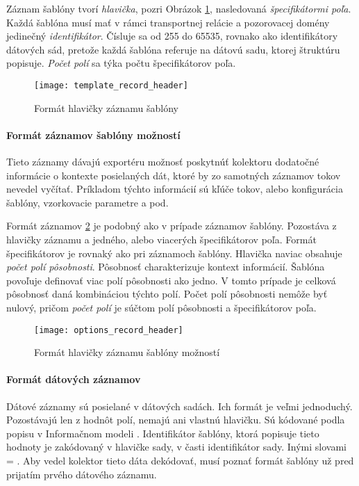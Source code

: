 Záznam šablóny tvorí \emph{hlavička}, pozri Obrázok \ref{o:template_record_header}, nasledovaná 
\emph{špecifikátormi poľa}. 
Každá šablóna musí mať v rámci transportnej relácie a pozorovacej domény jedinečný \emph{identifikátor}. 
Čísluje sa od 255 do 65535, rovnako ako identifikátory dátových sád, pretože každá šablóna referuje 
na dátovú sadu, ktorej štruktúru popisuje. \emph{Počet polí} sa týka počtu 
špecifikátorov poľa.

\begin{figure}[ht!]
\centering
\texttt{[image: template\_record\_header]}
\caption{Formát hlavičky záznamu šablóny}\label{o:template_record_header}
\end{figure}



\paragraph{Formát záznamov šablóny možností}

Tieto záznamy dávajú exportéru možnosť poskytnúť kolektoru dodatočné informácie o kontexte posielaných dát, 
ktoré by zo samotných 
záznamov tokov nevedel vyčítať. Príkladom týchto informácií sú kľúče tokov, alebo konfigurácia šablóny,
vzorkovacie parametre a pod.

Formát záznamov \ref{o:options_record_header} je podobný ako v prípade záznamov šablóny. Pozostáva z hlavičky záznamu 
a jedného, alebo viacerých špecifikátorov poľa. Formát špecifikátorov je rovnaký ako pri záznamoch šablóny.
Hlavička naviac obsahuje \emph{počet polí pôsobnosti}. Pôsobnosť charakterizuje kontext 
informácií. Šablóna povoľuje 
definovať viac polí pôsobnosti ako jedno. V tomto prípade je celková pôsobnosť daná kombináciou týchto polí.
Počet polí pôsobnosti nemôže byť nulový, pričom \emph{počet polí} je 
súčtom polí pôsobnosti a špecifikátorov poľa.\citep{rfc5102}

\begin{figure}[ht!]
\centering
\texttt{[image: options\_record\_header]}
\caption{Formát hlavičky záznamu šablóny možností}\label{o:options_record_header}
\end{figure}



\paragraph{Formát dátových záznamov}

Dátové záznamy sú posielané v dátových sadách. Ich formát je veľmi 
jednoduchý. Pozostávajú len z hodnôt polí, nemajú ani vlastnú hlavičku. 
Sú kódované podla popisu v Informačnom modeli \citep{rfc5102}. Identifikátor 
šablóny, ktorá popisuje tieto hodnoty je zakódovaný v hlavičke sady, v časti
identifikátor sady. Inými slovami  = . Aby vedel kolektor tieto dáta dekódovať, musí poznať formát šablóny 
už pred prijatím prvého dátového záznamu.
